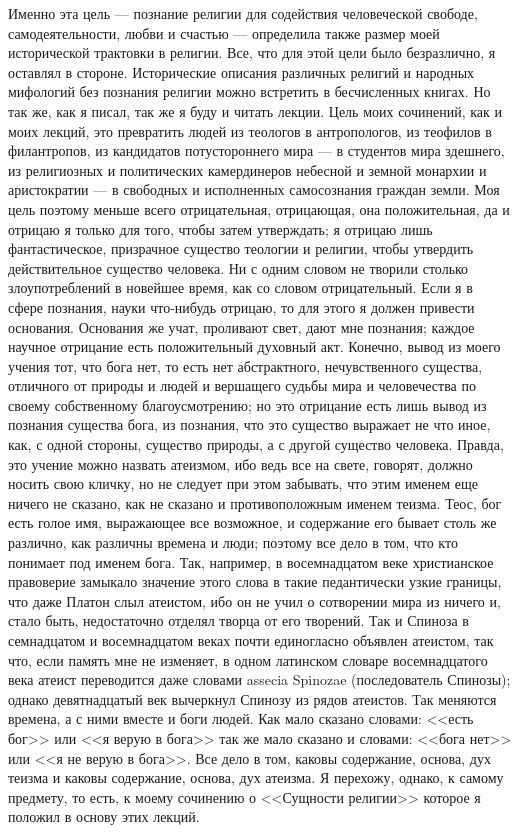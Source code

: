 \documentclass[12pt]{article}
\begin{document}
Именно эта цель --- познание религии для содействия человеческой свободе, самодеятельности, любви и счастью --- определила также размер моей исторической трактовки в религии. Все, что для этой цели было безразлично, я оставлял в стороне. Исторические описания различных религий и народных мифологий без познания религии можно встретить в бесчисленных книгах. Но так же, как я писал, так же я буду и читать лекции. Цель моих сочинений, как и моих лекций, это превратить людей из теологов в антропологов, из теофилов в филантропов, из кандидатов потустороннего мира --- в студентов мира здешнего, из религиозных и политических камердинеров небесной и земной монархии и аристократии --- в свободных и исполненных самосознания граждан земли. Моя цель поэтому меньше всего отрицательная, отрицающая, она положительная, да и отрицаю я только для того, чтобы затем утверждать; я отрицаю лишь фантастическое, призрачное существо теологии и религии, чтобы утвердить действительное существо человека. Ни с одним словом не творили столько злоупотреблений в новейшее время, как со словом отрицательный. Если я в сфере познания, науки что-нибудь отрицаю, то для этого я должен привести основания. Основания же учат, проливают свет, дают мне познания; каждое научное отрицание есть положительный духовный акт. Конечно, вывод из моего учения тот, что бога нет, то есть нет абстрактного, нечувственного существа, отличного от природы и людей и вершащего судьбы мира и человечества по своему собственному благоусмотрению; но это отрицание есть лишь вывод из познания существа бога, из познания, что это существо выражает не что иное, как, с одной стороны, существо природы, а с другой существо человека. Правда, это учение можно назвать атеизмом, ибо ведь все на свете, говорят, должно носить свою кличку, но не следует при этом забывать, что этим именем еще ничего не сказано, как не сказано и противоположным именем теизма. Теос, бог есть голое имя, выражающее все возможное, и содержание его бывает столь же различно, как различны времена и люди; поэтому все дело в том, что кто понимает под именем бога. Так, например, в восемнадцатом веке христианское правоверие замыкало значение этого слова в такие педантически узкие границы, что даже Платон слыл атеистом, ибо он не учил о сотворении мира из ничего и, стало быть, недостаточно отделял творца от его творений. Так и Спиноза в семнадцатом и восемнадцатом веках почти единогласно объявлен атеистом, так что, если память мне не изменяет, в одном латинском словаре восемнадцатого века атеист переводится даже словами assecia Spinozae (последователь Спинозы); однако девятнадцатый век вычеркнул Спинозу из рядов атеистов. Так меняются времена, а с ними вместе и боги людей. Как мало сказано словами: <<есть бог>>  или <<я верую в бога>>  так же мало сказано и словами: <<бога нет>>  или <<я не верую в бога>>. Все дело в том, каковы содержание, основа, дух теизма и каковы содержание, основа, дух атеизма. Я перехожу, однако, к самому предмету, то есть, к моему сочинению о <<Сущности религии>>  которое я положил в основу этих лекций.
\end{document}
